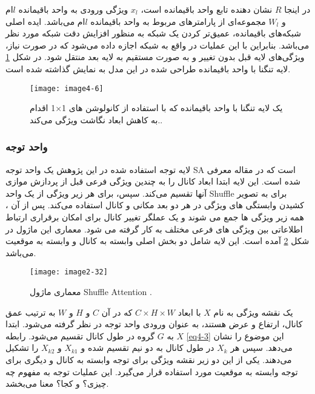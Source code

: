 \noindent
در اینجا $R$ نشان دهنده تابع واحد باقیمانده است، $x_l$ ویژگی ورودی به واحد باقیمانده $l$ام و $W_l$ مجموعه‌ای از پارامترهای مربوط به واحد باقیمانده $l$ام می‌باشد. ایده اصلی شبکه‌های باقیمانده، عمیق‌تر کردن یک شبکه به منظور افزایش دقت شبکه مورد نظر می‌باشد. بنابراین با این عملیات در واقع به شبکه اجازه داده می‌شود که در صورت نیاز، ویژگی‌های لایه قبل بدون تغییر و به صورت مستقیم به لایه بعد منتقل شود. در شکل \ref{image4-6} لایه تنگنا با واحد باقیمانده طراحی شده در این مدل به نمایش گذاشته شده است.

\begin{figure}[h]
\centering
  \texttt{[image: image4-6]}
  \caption{یک لایه تنگنا با واحد باقیمانده که با استفاده از کانولوشن های 1×1 اقدام به کاهش ابعاد نگاشت ویژگی می‌کند.‌.}
  \label{image4-6}
\end{figure}

\subsubsection{واحد توجه}
لایه توجه استفاده شده در این پژوهش یک واحد توجه SA  است که در مقاله \cite{yang2021sanet} معرفی شده است. این لایه ابتدا ابعاد کانال را به چندین ویژگی فرعی قبل از پردازش موازی آنها تقسیم می‌کند. سپس، برای هر زیر ویژگی از یک واحد Shuffle برای به تصویر کشیدن وابستگی های ویژگی در هر دو بعد مکانی و کانال استفاده می‌کند. پس از آن ، همه زیر ویژگی ها جمع می شوند و یک عملگر تغییر کانال برای امکان برقراری ارتباط اطلاعاتی بین ویژگی های فرعی مختلف به کار گرفته می شود. معماری این ماژول در شکل \ref{image2-32} آمده است. این لایه شامل دو بخش اصلی وابسته به کانال  و وابسته به موقعیت   می‌باشد. 

\begin{figure}[h]
\centering
  \texttt{[image: image2-32]}
  \caption{
  معماری ماژول Shuffle Attention
   \cite{yang2021sanet}.}
  \label{image2-32}
\end{figure}

\noindent
یک نقشه ویژگی  به نام $X$ با ابعاد $C \times H \times W$ که در آن $C$ و $H$ و $W$ به ترتیب عمق کانال، ارتفاع و عرض هستند، به عنوان ورودی واحد توجه در نظر گرفته می‌شود. ابتدا $X$ به $G$ گروه در طول کانال تقسیم می‌شود. رابطه \ref{eq4-3} این موضوع را نشان می‌دهد. سپس هر $X_k$ در طول کانال به دو نیم تقسیم شده و $X_{k1}$ و $X_{k2}$ را تشکیل می‌دهند. یکی از این دو زیر نقشه ویژگی   برای توجه وابسته به کانال و دیگری برای توجه وابسته به موقعیت مورد استفاده قرار می‌گیرد. این عملیات توجه به مفهوم چه چیزی؟ و کجا؟ معنا می‌بخشد. 

